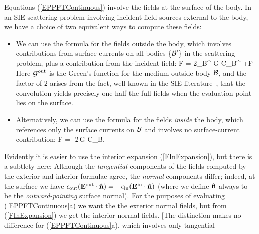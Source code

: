 Equations (\ref{EPPFTContinuous}) involve the fields at the surface
of the body. In an SIE scattering problem involving incident-field 
sources external to the body, we have a choice of two equivalent ways 
to compute these fields:
\begin{itemize}
\item We can use the formula for the fields outside the body, which
involves contributions from surface currents on all bodies
$\{\mathcal{B}^\prime\}$ in the scattering problem, plus a contribution 
from the incident field:
 {  \bmc F 
    =   2\sum_{\mc B^\prime} \bmc G \star \bmc C_{\mc B^\prime}
       +\bmc F
 }
Here $\boldsymbol{\mathcal{G}}^{\hbox{\scriptsize{out}}}$ is the Green's function for the medium outside
body $\mathcal{B}$, and the factor of $2$ arises from the fact, well known 
in the SIE literature~\cite{Chen1989},
that the convolution yields precisely one-half the full fields when
the evaluation point lies on the surface.
\item Alternatively, we can use the formula for the fields
      \textit{inside} the body, which references only the surface
      currents on $\mathcal{B}$ and involves no surface-current contribution:
 {  \bmc F
     = -2\,\bmc G \star \bmc C_{\mc B}.
 }
\end{itemize}
Evidently it is easier to use the interior expansion (\ref{FInExpansion}),
but there is a subtlety here: Although the \textit{tangential} 
components of the fields computed by the exterior and interior
formulae agree, the \textit{normal} components differ; indeed,
at the surface we have
$    \epsilon_{\hbox{\scriptsize{out}}}(\mathbf{E}^{\hbox{\scriptsize{out}}}\cdot \mathbf{\hat n})
  = -\epsilon_{\hbox{\scriptsize{in}}}(\mathbf{E}^{\hbox{\scriptsize{in}}}\cdot \mathbf{\hat n})
$ (where we define $\mathbf{\hat n}$ always to be the 
\textit{outward-pointing} surface normal).
For the purposes of evaluating (\ref{EPPFTContinuous}a) we want
the the exterior normal fields, but from (\ref{FInExpansion}) we get
the interior normal fields. [The distinction makes no difference
for (\ref{EPPFTContinuous}a), which involves only tangential 
